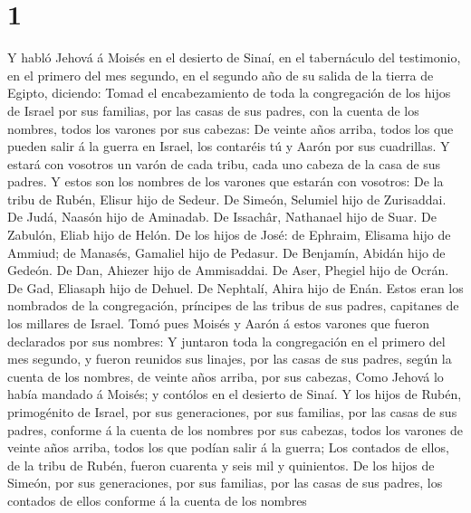 \hypertarget{section}{%
\section{1}\label{section}}

 Y habló Jehová á Moisés en el desierto de Sinaí, en el
tabernáculo del testimonio, en el primero del mes segundo, en el segundo
año de su salida de la tierra de Egipto, diciendo:  Tomad
el encabezamiento de toda la congregación de los hijos de Israel por sus
familias, por las casas de sus padres, con la cuenta de los nombres,
todos los varones por sus cabezas:  De veinte años arriba,
todos los que pueden salir á la guerra en Israel, los contaréis tú y
Aarón por sus cuadrillas.  Y estará con vosotros un varón
de cada tribu, cada uno cabeza de la casa de sus padres. 
Y estos son los nombres de los varones que estarán con vosotros: De la
tribu de Rubén, Elisur hijo de Sedeur.  De Simeón,
Selumiel hijo de Zurisaddai.  De Judá, Naasón hijo de
Aminadab.  De Issachâr, Nathanael hijo de Suar.
 De Zabulón, Eliab hijo de Helón.  De los
hijos de José: de Ephraim, Elisama hijo de Ammiud; de Manasés, Gamaliel
hijo de Pedasur.  De Benjamín, Abidán hijo de Gedeón.
 De Dan, Ahiezer hijo de Ammisaddai.  De
Aser, Phegiel hijo de Ocrán.  De Gad, Eliasaph hijo de
Dehuel.  De Nephtalí, Ahira hijo de Enán. 
Estos eran los nombrados de la congregación, príncipes de las tribus de
sus padres, capitanes de los millares de Israel.  Tomó
pues Moisés y Aarón á estos varones que fueron declarados por sus
nombres:  Y juntaron toda la congregación en el primero
del mes segundo, y fueron reunidos sus linajes, por las casas de sus
padres, según la cuenta de los nombres, de veinte años arriba, por sus
cabezas,  Como Jehová lo había mandado á Moisés; y
contólos en el desierto de Sinaí.  Y los hijos de Rubén,
primogénito de Israel, por sus generaciones, por sus familias, por las
casas de sus padres, conforme á la cuenta de los nombres por sus
cabezas, todos los varones de veinte años arriba, todos los que podían
salir á la guerra;  Los contados de ellos, de la tribu de
Rubén, fueron cuarenta y seis mil y quinientos.  De los
hijos de Simeón, por sus generaciones, por sus familias, por las casas
de sus padres, los contados de ellos conforme á la cuenta de los nombres
